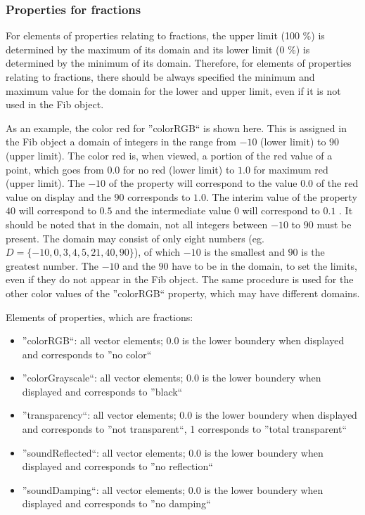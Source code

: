 \subsubsection{Properties for fractions}

For elements of properties relating to fractions, the upper limit (100 \%) is determined by the maximum of its domain and its lower limit (0 \%) is determined by the minimum of its domain. Therefore, for elements of properties relating to fractions, there should be always specified the minimum and maximum value for the domain for the lower and upper limit, even if it is not used in the Fib object.

As an example, the color red for ''colorRGB`` is shown here. This is assigned in the Fib object a domain of integers in the range from $-10$ (lower limit) to $90$ (upper limit). The color red is, when viewed, a portion of the red value of a point, which goes from $0.0$ for no red (lower limit) to $1.0$ for maximum red (upper limit). The $-10$ of the property will correspond to the value $0.0$ of the red value on display and the $90$ corresponds to $1.0$. The interim value of the property $40$ will correspond to $0.5$ and the intermediate value $0$ will correspond to $0.1$ . It should be noted that in the domain, not all integers between $-10$ to $90$ must be present. The domain may consist of only eight numbers (eg. $D=\{-10, 0, 3, 4, 5, 21, 40, 90\}$), of which $-10$ is the smallest and $90$ is the greatest number. The $-10$ and the $90$ have to be in the domain, to set the limits, even if they do not appear in the Fib object.
The same procedure is used for the other color values of the ''colorRGB`` property, which may have different domains.

\bigskip\noindent
Elements of properties, which are fractions:
\begin{itemize}
 \item ''colorRGB``: all vector elements; 0.0 is the lower boundery when displayed and corresponds to ''no color``
 \item ''colorGrayscale``: all vector elements; 0.0 is the lower boundery when displayed and corresponds to ''black``
 \item ''transparency``: all vector elements; 0.0 is the lower boundery when displayed and corresponds to ''not transparent``, 1 corresponds to ''total transparent``
 \item ''soundReflected``: all vector elements; 0.0 is the lower boundery when displayed and corresponds to ''no reflection``
 \item ''soundDamping``: all vector elements; 0.0 is the lower boundery when displayed and corresponds to ''no damping``
\end{itemize}

